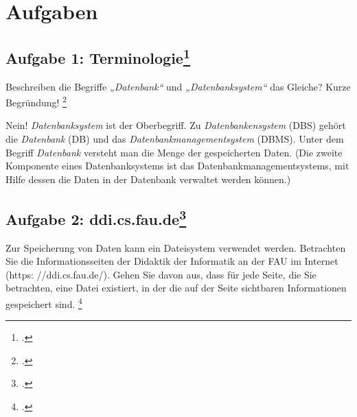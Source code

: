 \documentclass{lehramt-informatik}
\begin{document}

\chapter{Aufgaben}


\section{Aufgabe 1: Terminologie\footcite[Seite 1]{db:ab:1}}

\noindent
Beschreiben die Begriffe \emph{„Datenbank“} und \emph{„Datenbanksystem“}
das Gleiche?
Kurze Begründung!
\footcite[13]{winter}

\begin{antwort}
Nein! \emph{Datenbanksystem} ist der Oberbegriff. Zu
\emph{Datenbankensystem} (DBS) gehört die \emph{Datenbank} (DB) und das
\emph{Datenbankmanagementsystem} (DBMS). Unter dem Begriff
\emph{Datenbank} versteht man die Menge der gespeicherten Daten.
(Die zweite
Komponente eines Datenbanksystems ist das Datenbankmanagementsystems,
mit Hilfe dessen die Daten in der Datenbank verwaltet werden können.)
\end{antwort}


\section{Aufgabe 2: ddi.cs.fau.de\footcite[Seite 1]{db:ab:1}}

Zur Speicherung von Daten kann ein Dateisystem verwendet werden.
Betrachten Sie die Informationsseiten der Didaktik der Informatik an der
FAU im Internet (https: //ddi.cs.fau.de/). Gehen Sie davon aus, dass für
jede Seite, die Sie betrachten, eine Datei existiert, in der die auf der
Seite sichtbaren Informationen gespeichert sind.
\footcite[Seite 19-20]{winter}
\end{document}
